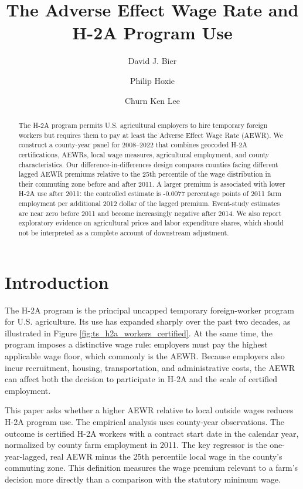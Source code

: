 \documentclass[14pt]{article}
\author[1]{David J. Bier}
\author[2]{Philip Hoxie}
\author[3]{Churn Ken Lee}
\affil[1]{CATO Institute}
\affil[2,3]{UC San Diego - Department of Economics}
\title{The Adverse Effect Wage Rate and H-2A Program Use}
\begin{document}
\maketitle

\begin{abstract}
The H-2A program permits U.S. agricultural employers to hire temporary foreign
workers but requires them to pay at least the Adverse Effect Wage Rate (AEWR).
We construct a county-year panel for 2008--2022 that combines geocoded H-2A
certifications, AEWRs, local wage measures, agricultural employment, and
county characteristics.  Our difference-in-differences design compares
counties facing different lagged AEWR premiums relative to the 25th percentile
of the wage distribution in their commuting zone before and after 2011.  A
larger premium is associated with lower H-2A use after 2011: the controlled
estimate is -0.0077 percentage points of 2011 farm employment per additional
2012 dollar of the lagged premium.  Event-study estimates are near zero before
2011 and become increasingly negative after 2014.  We also report exploratory
evidence on agricultural prices and labor expenditure shares, which should not
be interpreted as a complete account of downstream adjustment.
\end{abstract}

\section{Introduction}
\label{sec:introduction}
The H-2A program is the principal uncapped temporary foreign-worker program
for U.S. agriculture.  Its use has expanded sharply over the past two decades,
as illustrated in Figure \ref{fig:ts_h2a_workers_certified}.  At the same
time, the program imposes a distinctive wage rule: employers must pay the
highest applicable wage floor, which commonly is the AEWR.  Because employers
also incur recruitment, housing, transportation, and administrative costs,
the AEWR can affect both the decision to participate in H-2A and the scale of
certified employment.

This paper asks whether a higher AEWR relative to local outside wages reduces
H-2A program use.  The empirical analysis uses county-year observations.  The
outcome is certified H-2A workers with a contract start date in the calendar
year, normalized by county farm employment in 2011.  The key regressor is the
one-year-lagged, real AEWR minus the 25th percentile local wage in the
county's commuting zone.  This definition measures the wage premium relevant
to a farm's decision more directly than a comparison with the statutory
minimum wage.
\end{document}
